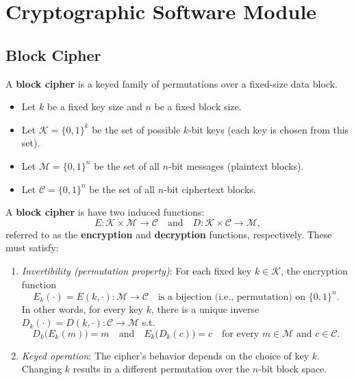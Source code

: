 \documentclass[11pt,a4paper]{report}
\theoremstyle{definitionstyle}
\begin{document}
\newpage
\chapter{Cryptographic Software Module}

\section{Block Cipher}
A \textbf{block cipher} is a keyed family of permutations over a fixed-size data block. \begin{itemize}
	\item Let \(k\) be a fixed key size and \(n\) be a fixed block size.
	\item Let \(\mathcal{K} = \{0,1\}^k\) be the set of possible $k$-bit keys (each key is chosen from this set).
	\item Let \(\mathcal{M} = \{0,1\}^n\) be the set of all \(n\)-bit messages (plaintext blocks).
	\item Let \(\mathcal{C} = \{0,1\}^n\) be the set of all \(n\)-bit ciphertext blocks.
\end{itemize}
A \textbf{block cipher} is have two induced functions: \[
E : \mathcal{K} \times \mathcal{M} \to \mathcal{C} 
\quad\text{and}\quad
D : \mathcal{K} \times \mathcal{C} \to \mathcal{M},
\] referred to as the \textbf{encryption} and \textbf{decryption} functions, respectively. These must satisfy:
\begin{enumerate}
	\item \emph{Invertibility (permutation property)}: For each fixed key \(k \in \mathcal{K}\), the encryption function \[
	E_k(\cdot) = E(k, \cdot): \mathcal{M} \to \mathcal{C}\quad\text{is a bijection (i.e., permutation) on $\{0,1\}^n$.}
	\] In other words, for every key \(k\), there is a unique inverse $D_k(\cdot) = D(k, \cdot): \mathcal{C} \to \mathcal{M}$
	s.t. \[
	D_k\bigl(E_k(m)\bigr) = m \quad \text{and} \quad E_k\bigl(D_k(c)\bigr) = c\quad\text{for every $m \in \mathcal{M}$ and $c \in \mathcal{C}$.}
	\]
	\item \emph{Keyed operation}: The cipher’s behavior depends on the choice of key \(k\). Changing \(k\) results in a different permutation over the \(n\)-bit block space.
\end{enumerate}
\end{document}
